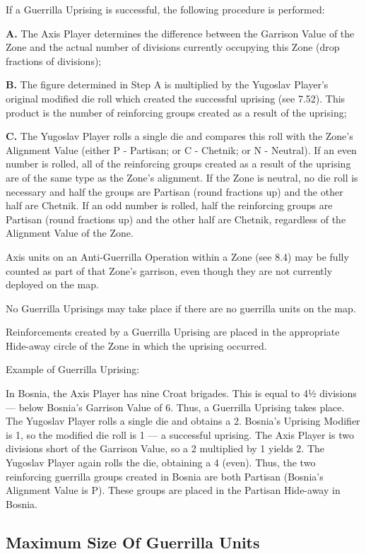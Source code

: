  If a Guerrilla Uprising is successful, the following procedure is performed:

\textbf{A.} The Axis Player determines the difference between the Garrison Value of the Zone and the actual number of divisions currently occupying this Zone (drop fractions of divisions);

\textbf{B.} The figure determined in Step A is multiplied by the Yugoslav Player’s original modified die roll which created the successful uprising (see 7.52). This product is the number of reinforcing groups created as a result of the uprising;

\textbf{C.} The Yugoslav Player rolls a single die and compares this roll with the Zone’s Alignment Value (either P - Partisan; or C - Chetnik; or N - Neutral). If an even number is rolled, all of the reinforcing groups created as a result of the uprising are of the same type as the Zone’s alignment. If the Zone is neutral, no die roll is necessary and half the groups are Partisan (round fractions up) and the other half are Chetnik. If an odd number is rolled, half the reinforcing groups are Partisan (round fractions up) and the other half are Chetnik, regardless of the Alignment Value of the Zone.

 Axis units on an Anti-Guerrilla Operation within a Zone (see 8.4) may be fully counted as part of that Zone’s garrison, even though they are not currently deployed on the map.

 No Guerrilla Uprisings may take place if there are no guerrilla units on the map.

 Reinforcements created by a Guerrilla Uprising are placed in the appropriate Hide-away circle of the Zone in which the uprising occurred.

Example of Guerrilla Uprising:

In Bosnia, the Axis Player has nine Croat brigades. This is equal to 4½ divisions — below Bosnia’s Garrison Value of 6. Thus, a Guerrilla Uprising takes place. The Yugoslav Player rolls a single die and obtains a 2. Bosnia’s Uprising Modifier is 1, so the modified die roll is 1 — a successful uprising. The Axis Player is two divisions short of the Garrison Value, so a 2 multiplied by 1 yields 2. The Yugoslav Player again rolls the die, obtaining a 4 (even). Thus, the two reinforcing guerrilla groups created in Bosnia are both Partisan (Bosnia’s Alignment Value is P). These groups are placed in the Partisan Hide-away in Bosnia.

\subsection{Maximum Size Of Guerrilla Units}\label{sec:7.6}

